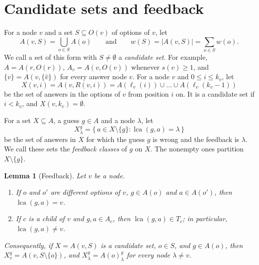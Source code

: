 \documentclass[11pt]{article}
\newtheorem{lemma}[theorem]{Lemma}
\newcommand{\lca}{\operatorname{lca}}
\begin{document}
\section{Candidate sets and feedback}
\label{sec:feedback}

For a node $v$ and a set $S \subseteq O(v)$ of options of $v$, let
\[
  A(v, S) = \bigcup_{o \in S} A(o)
  \qquad\text{and}\qquad
  w(S) = |A(v, S)| = \sum_{o \in S} w(o).
\]
We call a set of this form with $S \ne \emptyset$ a \emph{candidate set}. For
example, $A = A(r, O(r))$, $A_v = A(v, O(v))$ whenever $s(v) \ge 1$, and
$\{v\} = A(v, \{\hat v\})$ for every answer node $v$. For a node $v$ and
$0 \le i \le k_v$, let
\[
  X(v, i) = A(v, R(v, i)) = A(\ell_v(i)) \cup \dots \cup A(\ell_v(k_v - 1))
\]
be the set of answers in the options of $v$ from position $i$ on. It is a
candidate set if $i < k_v$, and $X(v, k_v) = \emptyset$.

For a set $X \subseteq A$, a guess $g \in A$ and a node $\lambda$, let
\[
  X^g_\lambda = \{\, a \in X \setminus \{g\} : \lca(g, a) = \lambda \,\}
\]
be the set of answers in $X$ for which the guess $g$ is wrong and the feedback is
$\lambda$. We call these sets the \emph{feedback classes} of $g$ on $X$. The
nonempty ones partition $X \setminus \{g\}$.

\begin{lemma}[Feedback]
  \label{lem:feedback}
  Let $v$ be a node.
  \begin{enumerate}[label=(\alph*)]
    \item If $o$ and $o'$ are different options of $v$, $g \in A(o)$ and
      $a \in A(o')$, then $\lca(g, a) = v$.
    \item If $c$ is a child of $v$ and $g, a \in A_c$, then $\lca(g, a) \in T_c$;
      in particular, $\lca(g, a) \ne v$.
  \end{enumerate}
  Consequently, if $X = A(v, S)$ is a candidate set, $o \in S$, and $g \in A(o)$,
  then $X^g_v = A(v, S \setminus \{o\})$, and $X^g_\lambda = A(o)^g_\lambda$ for
  every node $\lambda \ne v$.
\end{lemma}
\end{document}
